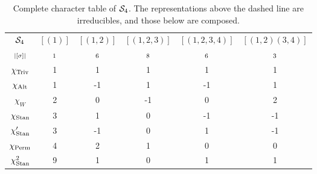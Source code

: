 {\begin{example}
	\begin{table}[hbt!]
		\centering
		\begin{tabular}{c | c c c c c}
			$\mathcal{S}_4$         & $[(1)]$   & $[(1,2)]$  & $[(1,2,3)]$ & $[(1,2,3,4)]$ & $[(1,2)(3,4)]$ \\
			$\scriptstyle|[\sigma]|$    & $\scriptstyle 1$ & $\scriptstyle 6$ & $\scriptstyle 8$ & $\scriptstyle 6$  & $\scriptstyle 3$      \\ \hline
			$\chi_{\text{Triv}}$       & 1       & 1       & 1       & 1        & 1            \\
			$\chi_{\text{Alt}}$       & 1       & -1      & 1       & -1       & 1            \\
			$\chi_W$       & 2       & 0       & -1      & 0        & 2            \\
			$\chi_{\text{Stan}}$       & 3       & 1       & 0       & -1       & -1           \\
			$\chi'_{\text{Stan}}$ & 3       & -1      & 0       & 1        & -1           \\ \hline\hline
			$\chi_{\text{Perm}}$       & 4       & 2       & 1       & 0        & 0            \\
			$\chi_{\text{Stan}}^2$ & 9       & 1       & 0       & 1        & 1            \\
		\end{tabular}
		\caption{Complete character table of $\mathcal{S}_4$. The representations above the dashed line are irreducibles, and those below are composed.}
		\label{table:completecharS4}
	\end{table}
\end{example}


}
